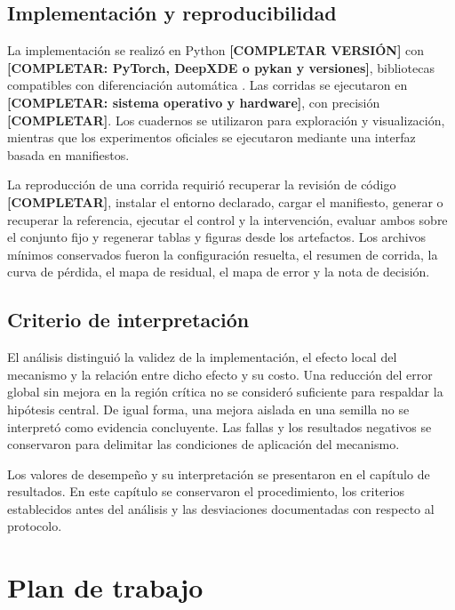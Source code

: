 \section{Implementación y reproducibilidad}
\label{subsec:reproducibilidad}

La implementación se realizó en Python \textbf{[COMPLETAR VERSIÓN]} con \textbf{[COMPLETAR: PyTorch, DeepXDE o pykan y versiones]}, bibliotecas compatibles con diferenciación automática \cite{paszke2019pytorch,lu2021deepxde,liu2024kan}. Las corridas se ejecutaron en \textbf{[COMPLETAR: sistema operativo y hardware]}, con precisión \textbf{[COMPLETAR]}. Los cuadernos se utilizaron para exploración y visualización, mientras que los experimentos oficiales se ejecutaron mediante una interfaz basada en manifiestos.

La reproducción de una corrida requirió recuperar la revisión de código \textbf{[COMPLETAR]}, instalar el entorno declarado, cargar el manifiesto, generar o recuperar la referencia, ejecutar el control y la intervención, evaluar ambos sobre el conjunto fijo y regenerar tablas y figuras desde los artefactos. Los archivos mínimos conservados fueron la configuración resuelta, el resumen de corrida, la curva de pérdida, el mapa de residual, el mapa de error y la nota de decisión.

\section{Criterio de interpretación}
\label{subsec:analisis-refinamiento}

El análisis distinguió la validez de la implementación, el efecto local del mecanismo y la relación entre dicho efecto y su costo. Una reducción del error global sin mejora en la región crítica no se consideró suficiente para respaldar la hipótesis central. De igual forma, una mejora aislada en una semilla no se interpretó como evidencia concluyente. Las fallas y los resultados negativos se conservaron para delimitar las condiciones de aplicación del mecanismo.

Los valores de desempeño y su interpretación se presentaron en el capítulo de resultados. En este capítulo se conservaron el procedimiento, los criterios establecidos antes del análisis y las desviaciones documentadas con respecto al protocolo.

\chapter{Plan de trabajo}
\label{sec:plan-trabajo}

